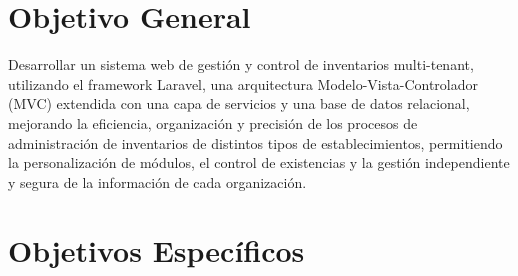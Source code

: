 \section{Objetivo General}

Desarrollar un sistema web de gestión y control de inventarios multi-tenant, utilizando el framework Laravel, una arquitectura Modelo-Vista-Controlador (MVC) extendida con una capa de servicios y una base de datos relacional, mejorando la eficiencia, organización y precisión de los procesos de administración de inventarios de distintos tipos de establecimientos, permitiendo la personalización de módulos, el control de existencias y la gestión independiente y segura de la información de cada organización.

\section{Objetivos Específicos}
